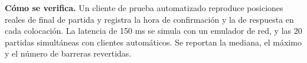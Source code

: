\textbf{Cómo se verifica.} Un cliente de prueba automatizado reproduce posiciones reales de final de partida y registra la hora de confirmación y la de respuesta en cada colocación. La latencia de 150 ms se simula con un emulador de red, y las 20 partidas simultáneas con clientes automáticos. Se reportan la mediana, el máximo y el número de barreras revertidas.
